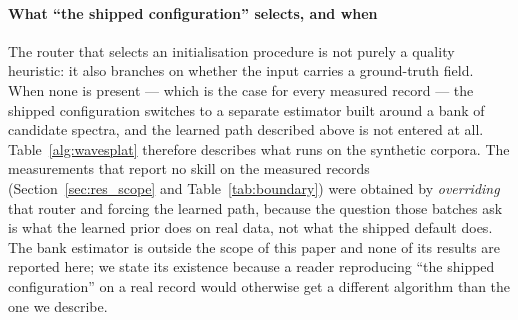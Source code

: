 \documentclass[review]{elsarticle}
\begin{document}
\paragraph{What ``the shipped configuration'' selects, and when}
The router that selects an initialisation procedure is not purely a quality
heuristic: it also branches on whether the input carries a ground-truth field.
When none is present --- which is the case for every measured record --- the
shipped configuration switches to a separate estimator built around a bank of
candidate spectra, and the learned path described above is not entered at all.
Table~\ref{alg:wavesplat} therefore describes what runs on the synthetic corpora.
The measurements that report no skill on the measured records
(Section~\ref{sec:res_scope} and Table~\ref{tab:boundary}) were obtained by
\emph{overriding} that router and forcing the learned path, because the question those batches ask is what the learned prior does
on real data, not what the shipped default does. The bank estimator is outside the
scope of this paper and none of its results are reported here; we state its
existence because a reader reproducing ``the shipped configuration'' on a real
record would otherwise get a different algorithm than the one we describe.
\end{document}
